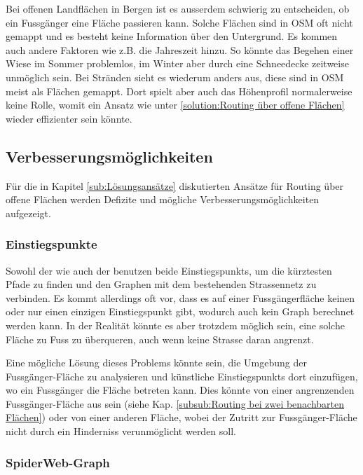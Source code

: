 Bei offenen Landflächen in Bergen ist es ausserdem schwierig zu entscheiden, ob ein Fussgänger eine Fläche passieren kann. Solche Flächen sind in \ac{OSM} oft nicht gemappt und es besteht keine Information über den Untergrund. Es kommen auch andere Faktoren wie z.B. die Jahreszeit hinzu. So könnte das Begehen einer Wiese im Sommer problemlos, im Winter aber durch eine Schneedecke zeitweise unmöglich sein. Bei Stränden sieht es wiederum anders aus, diese sind in \ac{OSM} meist als Flächen gemappt. Dort spielt aber auch das Höhenprofil normalerweise keine Rolle, womit ein Ansatz wie unter \ref{solution:Routing über offene Flächen} wieder effizienter sein könnte.


\subsection{Verbesserungsmöglichkeiten}
\label{sub:Verbesserungsmöglichkeiten}
Für die in Kapitel \ref{sub:Lösungsansätze} diskutierten Ansätze für Routing über offene Flächen werden Defizite und mögliche Verbesserungsmöglichkeiten aufgezeigt.

\subsubsection{Einstiegspunkte}
\label{subsub:Verbesserung_Einstiegspunkte}

Sowohl der  wie auch der  benutzen beide \glspl{Einstiegspunkt}, um die kürztesten Pfade zu finden und den Graphen mit dem bestehenden Strassennetz zu verbinden. Es kommt allerdings oft vor, dass es auf einer Fussgängerfläche keinen oder nur einen einzigen Einstiegspunkt gibt, wodurch auch kein Graph berechnet werden kann. In der Realität könnte es aber trotzdem möglich sein, eine solche Fläche zu Fuss zu überqueren, auch wenn keine Strasse daran angrenzt.

Eine mögliche Lösung dieses Problems könnte sein, die Umgebung der Fussgänger-Fläche zu analysieren und künstliche \glspl{Einstiegspunkt} dort einzufügen, wo ein Fussgänger die Fläche betreten kann. Dies könnte von einer angrenzenden Fussgänger-Fläche aus sein (siehe Kap. \ref{subsub:Routing bei zwei benachbarten Flächen}) oder von einer anderen Fläche, wobei der Zutritt zur Fussgänger-Fläche nicht durch ein Hinderniss verunmöglicht werden soll.

\subsubsection{SpiderWeb-Graph}
\label{subsub:Verbesserung_SpiderWeb}

